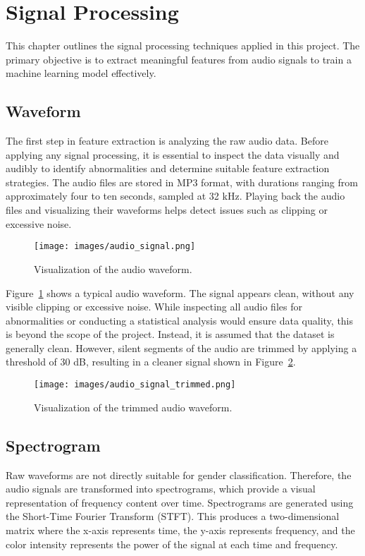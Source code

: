 \section{Signal Processing}
\label{sec:processing}

This chapter outlines the signal processing techniques applied in this project. The primary objective is to extract meaningful features from audio signals to train a machine learning model effectively.

\subsection{Waveform}
The first step in feature extraction is analyzing the raw audio data. Before applying any signal processing, it is essential to inspect the data visually and audibly to identify abnormalities and determine suitable feature extraction strategies. The audio files are stored in MP3 format, with durations ranging from approximately four to ten seconds, sampled at 32 kHz. Playing back the audio files and visualizing their waveforms helps detect issues such as clipping or excessive noise.

\begin{figure}[h]
    \centering
    \texttt{[image: images/audio\_signal.png]}
    \caption{Visualization of the audio waveform.}
    \label{fig:audiosignal}
\end{figure}

Figure~\ref{fig:audiosignal} shows a typical audio waveform. The signal appears clean, without any visible clipping or excessive noise. While inspecting all audio files for abnormalities or conducting a statistical analysis would ensure data quality, this is beyond the scope of the project. Instead, it is assumed that the dataset is generally clean. However, silent segments of the audio are trimmed by applying a threshold of 30 dB, resulting in a cleaner signal shown in Figure~\ref{fig:audiosignaltrimmed}.

\begin{figure}[h]
    \centering
    \texttt{[image: images/audio\_signal\_trimmed.png]}
    \caption{Visualization of the trimmed audio waveform.}
    \label{fig:audiosignaltrimmed}
\end{figure}

\subsection{Spectrogram}
Raw waveforms are not directly suitable for gender classification. Therefore, the audio signals are transformed into spectrograms, which provide a visual representation of frequency content over time. Spectrograms are generated using the Short-Time Fourier Transform (STFT). This produces a two-dimensional matrix where the x-axis represents time, the y-axis represents frequency, and the color intensity represents the power of the signal at each time and frequency.

